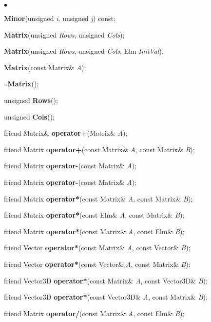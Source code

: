 \documentclass{article}
\newcommand{\Func}[1]{\textbf{#1}}
\newcommand{\var}[1]{\textit{#1}}
\newcommand{\tild}{\ensuremath{\overset{\sim}{~}}}
\newenvironment{LIST}{\begin{list}{$\bullet$}{%
      \setlength{\leftmargin}{2\leftmargin}%
      \setlength{\itemindent}{-1cm}}}%
  {\end{list}}
\begin{document}
\begin{LIST}
 \item \Func{Minor}(unsigned \var{i}, unsigned \var{j}) const;\\
 \item \Func{Matrix}(unsigned \var{Rows}, unsigned \var{Cols});\\
 \item \Func{Matrix}(unsigned \var{Rows}, unsigned \var{Cols}, Elm \var{InitVal});\\
 \item \Func{Matrix}(const Matrix\& \var{A});\\
 \item \Func{\tild Matrix}();\\

 \item unsigned \Func{Rows}();\\
 \item unsigned \Func{Cols}();\\
  
 \item friend Matrix\& \Func{operator+}(Matrix\& \var{A});\\
 \item friend Matrix \Func{operator+}(const Matrix\& \var{A}, const Matrix\& \var{B});\\
 \item friend Matrix \Func{operator-}(const Matrix\& \var{A});\\
 \item friend Matrix \Func{operator-}(const Matrix\& \var{A});\\
 \item friend Matrix \Func{operator*}(const Matrix\& \var{A}, const Matrix\& \var{B});\\
 \item friend Matrix \Func{operator*}(const Elm\& \var{A}, const Matrix\& \var{B});\\
 \item friend Matrix \Func{operator*}(const Matrix\& \var{A}, const Elm\& \var{B});\\
 \item friend Vector \Func{operator*}(const Matrix\& \var{A}, const Vector\& \var{B});\\
 \item friend Vector \Func{operator*}(const Vector\& \var{A}, const Matrix\& \var{B});\\
 \item friend Vector3D \Func{operator*}(const Matrix\& \var{A}, const Vector3D\& \var{B});\\
 \item friend Vector3D \Func{operator*}(const Vector3D\& \var{A}, const Matrix\& \var{B});\\
 \item friend Matrix \Func{operator/}(const Matrix\& \var{A}, const  Elm\& \var{B});\\


\end{LIST}
\end{document}

